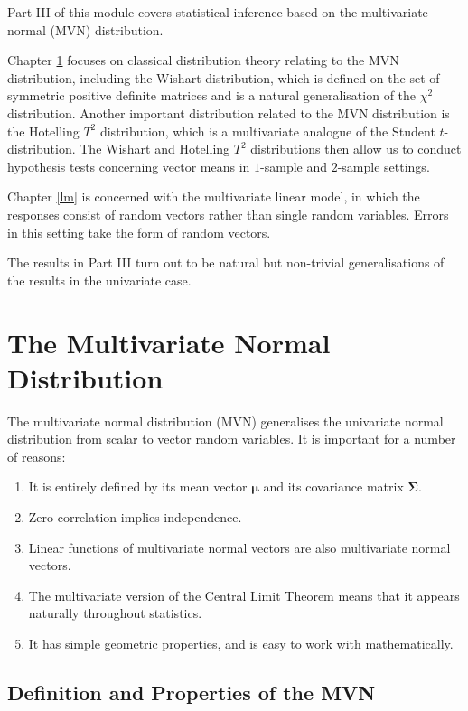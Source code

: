 \documentclass[]{book}
\providecommand{\tightlist}{%
  \setlength{\itemsep}{0pt}\setlength{\parskip}{0pt}}
\theoremstyle{definition}
\theoremstyle{definition}
\theoremstyle{definition}
\theoremstyle{remark}
\begin{document}
Part III of this module covers statistical inference based on the multivariate normal (MVN) distribution.

Chapter \ref{multinormal} focuses on classical distribution theory relating to the MVN distribution, including the Wishart distribution, which is defined on the set of symmetric positive definite matrices and is a natural generalisation of the \(\chi^2\) distribution. Another important distribution related to the MVN distribution is the Hotelling \(T^2\) distribution, which is a multivariate analogue of the Student \(t\)-distribution.
The Wishart and Hotelling \(T^2\) distributions then allow us to conduct hypothesis tests concerning vector means in \(1\)-sample and \(2\)-sample settings.

Chapter \ref{lm} is concerned with the multivariate linear model, in which the responses consist of random vectors rather than single random variables. Errors in this setting take the form of random vectors.

The results in Part III turn out to be natural but non-trivial generalisations of the results in the univariate case.

\hypertarget{multinormal}{%
\chapter{The Multivariate Normal Distribution}\label{multinormal}}

The multivariate normal distribution (MVN) generalises the univariate normal distribution from scalar to vector random variables. It is important for a number of reasons:

\begin{enumerate}
\def\labelenumi{\arabic{enumi}.}
\tightlist
\item
  It is entirely defined by its mean vector \(\boldsymbol \mu\) and its covariance matrix \(\boldsymbol \Sigma\).
\item
  Zero correlation implies independence.
\item
  Linear functions of multivariate normal vectors are also multivariate normal vectors.
\item
  The multivariate version of the Central Limit Theorem means that it appears naturally throughout statistics.
\item
  It has simple geometric properties, and is easy to work with mathematically.
\end{enumerate}

\hypertarget{definition-and-properties-of-the-mvn}{%
\section{Definition and Properties of the MVN}\label{definition-and-properties-of-the-mvn}}
\end{document}
